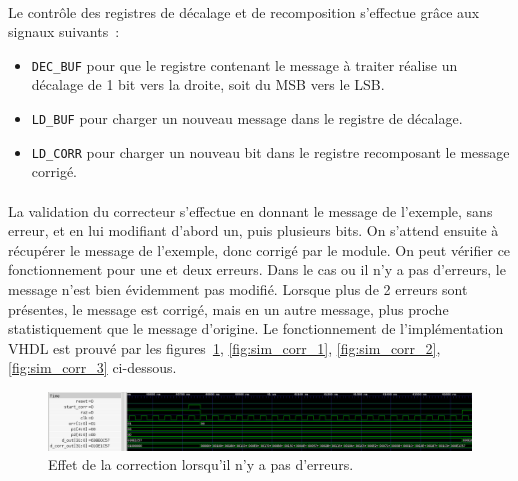 \documentclass[a4paper, 11pt, svgnames]{report}
\begin{document}
            \paragraph{}
                Le contrôle des registres de décalage et de recomposition
                s'effectue grâce aux signaux suivants~:
                 \begin{itemize}
                    \item \verb|DEC_BUF| pour que le registre contenant le
                        message à traiter réalise un décalage de 1 bit vers la
                         droite, soit du MSB vers le LSB.
                    \item \verb|LD_BUF| pour charger un nouveau message dans le
                        registre de décalage.
                    \item \verb|LD_CORR| pour charger un nouveau bit dans le
                        registre recomposant le message corrigé.
                \end{itemize}

            \paragraph{}
                La validation du correcteur s'effectue en donnant le message de
                l'exemple, sans erreur, et en lui modifiant d'abord un, puis
                plusieurs bits. On s'attend ensuite à récupérer le message de
                l'exemple, donc corrigé par le module. On peut vérifier ce
                fonctionnement pour une et deux erreurs. Dans le cas ou il n'y
                a pas d'erreurs, le message n'est bien évidemment pas modifié.
                Lorsque plus de 2 erreurs sont présentes, le message est
                corrigé, mais en un autre message, plus proche statistiquement
                que le message d'origine. Le fonctionnement de l'implémentation
                VHDL est prouvé par les figures~\ref{fig:sim_corr_0},
                \ref{fig:sim_corr_1}, \ref{fig:sim_corr_2},
                \ref{fig:sim_corr_3} ci-dessous.

                \begin{figure}[H]
                    \centering
                    \includegraphics[width=\textwidth]{./images/corr_0_err.png}
                    \caption{Effet de la correction lorsqu'il n'y a pas d'erreurs.}
                    \label{fig:sim_corr_0}
                \end{figure}
\end{document}

